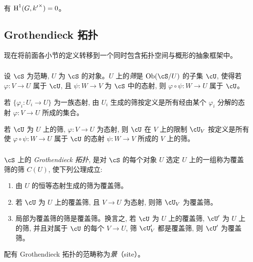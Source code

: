 \begin{corollary}\label{I:1-5-3}
有 $\operatorname{H}^1(G,{k'}^\times)=0$。
\end{corollary}

\subsection{Grothendieck 拓扑}\label{I:1-6}

现在将前面各小节的定义转移到一个同时包含拓扑空间与概形的抽象框架中。

\subsubsection{}\label{I:1-6-1}

设 $\cS$ 为范畴, $U$ 为 $\cS$ 的对象。$U$ 上的\emph{筛}是 $\ob(\cS/U)$ 的子集 $\cU$, 使得若 $\varphi:V\to U$ 属于 $\cU$, 且 $\psi:W\to V$ 为 $\cS$ 中的态射, 则 $\varphi\circ\psi:W\to U$ 属于 $\cU$。

若 $\{\varphi_i:U_i\to U\}$ 为一族态射, 由 $U_i$ 生成的筛按定义是所有经由某个 $\varphi_i$ 分解的态射 $\varphi:V\to U$ 所成的集合。

若 $\cU$ 为 $U$ 上的筛, $\varphi:V\to U$ 为态射, 则 $\cU$ 在 $V$ 上的限制 $\cU_V$ 按定义是所有使 $\varphi\circ\psi:W\to U$ 属于 $\cU$ 的态射 $\psi:W\to V$ 所成的 $V$ 上的筛。

\subsubsection{}\label{I:1-6-2}

$\cS$ 上的 \emph{Grothendieck 拓扑}, 是对 $\cS$ 的每个对象 $U$ 选定 $U$ 上的一组称为覆盖筛的筛 $C(U)$, 使下列公理成立:
\begin{enumerate}[\indent a)]
  \item 由 $U$ 的恒等态射生成的筛为覆盖筛。
  \item 若 $\cU$ 为 $U$ 上的覆盖筛, 且 $V\to U$ 为态射, 则筛 $\cU_V$ 为覆盖筛。
  \item 局部为覆盖筛的筛是覆盖筛。换言之, 若 $\cU$ 为 $U$ 上的覆盖筛, $\cU'$ 为 $U$ 上的筛, 并且对属于 $\cU$ 的每个 $V\to U$, 筛 $\cU_V'$ 都是覆盖筛, 则 $\cU'$ 为覆盖筛。
\end{enumerate}

配有 Grothendieck 拓扑的范畴称为\emph{景}（site）。

\subsubsection{}\label{I:1-6-3}

